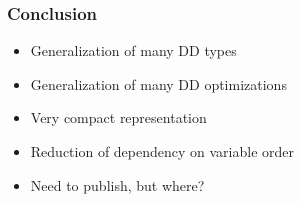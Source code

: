 \documentclass[english]{beamer}
\begin{document}
\begin{frame}
  \frametitle{Conclusion}
  \begin{itemize}
    \item Generalization of many DD types
    \item Generalization of many DD optimizations
    \item Very compact representation
    \item Reduction of dependency on variable order
    \item Need to publish, but where?
  \end{itemize}
\end{frame}

\begin{frame}[allowframebreaks]
  
  
\end{frame}
\end{document}
